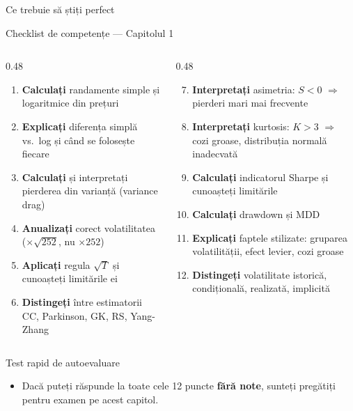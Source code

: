 \documentclass[9pt, aspectratio=169, t]{beamer}
\theoremstyle{definition}
\begin{document}
\begin{frame}[shrink=5]{Ce trebuie să știți perfect}
\begin{block}{Checklist de competențe --- Capitolul 1}
\begin{columns}[T]
\begin{column}{0.48\textwidth}
\begin{enumerate}
    \item[\checkmark] \textbf{Calculați} randamente simple și logaritmice din prețuri
    \item[\checkmark] \textbf{Explicați} diferența simplă vs.\ log și când se folosește fiecare
    \item[\checkmark] \textbf{Calculați} și interpretați pierderea din varianță (variance drag)
    \item[\checkmark] \textbf{Anualizați} corect volatilitatea ($\times\sqrt{252}$, nu $\times 252$)
    \item[\checkmark] \textbf{Aplicați} regula $\sqrt{T}$ și cunoașteți limitările ei
    \item[\checkmark] \textbf{Distingeți} între estimatorii CC, Parkinson, GK, RS, Yang-Zhang
\end{enumerate}
\end{column}
\begin{column}{0.48\textwidth}
\begin{enumerate}\setcounter{enumi}{6}
    \item[\checkmark] \textbf{Interpretați} asimetria: $S < 0$ $\Rightarrow$ pierderi mari mai frecvente
    \item[\checkmark] \textbf{Interpretați} kurtosis: $K > 3$ $\Rightarrow$ cozi groase, distribuția normală inadecvată
    \item[\checkmark] \textbf{Calculați} indicatorul Sharpe și cunoașteți limitările
    \item[\checkmark] \textbf{Calculați} drawdown și MDD
    \item[\checkmark] \textbf{Explicați} faptele stilizate: gruparea volatilității, efect levier, cozi groase
    \item[\checkmark] \textbf{Distingeți} volatilitate istorică, condițională, realizată, implicită
\end{enumerate}
\end{column}
\end{columns}
\end{block}
\vspace{0.1cm}
\begin{exampleblock}{Test rapid de autoevaluare}
\begin{itemize}\setlength{\itemsep}{0pt}
    \item Dacă puteți răspunde la toate cele 12 puncte \textbf{fără note}, sunteți pregătiți pentru examen pe acest capitol.
\end{itemize}
\end{exampleblock}
\end{frame}
\end{document}
